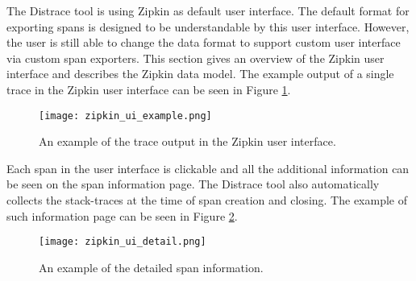 The Distrace tool is using Zipkin as default user interface. The default format for exporting spans is designed to be understandable by this user interface. However, the user is still able to change the data format to support custom user interface via custom span exporters. This section gives an overview of the Zipkin user interface and describes the Zipkin data model. The example output of a single trace in the Zipkin user interface can be seen in Figure \ref{fig:zipkin_ui}.

\begin{figure}
	\centering
	\texttt{[image: zipkin\_ui\_example.png]}
	\caption{An example of the trace output in the Zipkin user interface.}
	\label{fig:zipkin_ui}
\end{figure}

Each span in the user interface is clickable and all the additional information can be seen on the span information page. The Distrace tool also automatically collects the stack-traces at the time of span creation and closing. The example of such information page can be seen in Figure \ref{fig:zipkin_ui_detail}.
\begin{figure}
	\centering
	\texttt{[image: zipkin\_ui\_detail.png]}
	\caption{An example of the detailed span information.}
	\label{fig:zipkin_ui_detail}
\end{figure}
